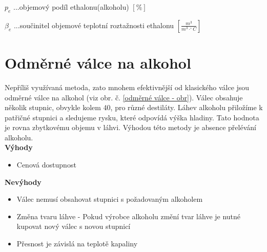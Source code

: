 \(p_e\) ...objemový podíl ethalonu(alkoholu) \([\%]\) 

\(\beta_e\) ...součinitel objemové teplotní roztažnosti ethalonu \([\frac{m^3}{m^3 \cdot ^\circ C}]\)




\section{Odměrné válce na alkohol}
\label{valec_na_alkohol}

Nepříliš využívaná metoda, zato mnohem efektivnější od klasického válce jsou odměrné válce na alkohol (viz obr. č. \ref{odměrné válce - obr}). Válec obsahuje několik stupnic, obvykle kolem 40, pro různé destiláty. Láhev alkoholu přiložíme k patřičné stupnici a sledujeme rysku, které odpovídá výška hladiny. Tato hodnota je rovna zbytkovému objemu v láhvi. Výhodou této metody je absence přelévání alkoholu.\\



\textbf{Výhody}
\begin{itemize}
    \item Cenová dostupnost\\
\end{itemize}

\textbf{Nevýhody}
\begin{itemize}
    \item Válec nemusí obsahovat stupnici s požadovaným alkoholem
    \item Změna tvaru láhve - Pokud výrobce alkoholu změní tvar láhve je nutné kupovat nový válec s novou stupnicí
    \item Přesnost je závislá na teplotě kapaliny
\end{itemize}

